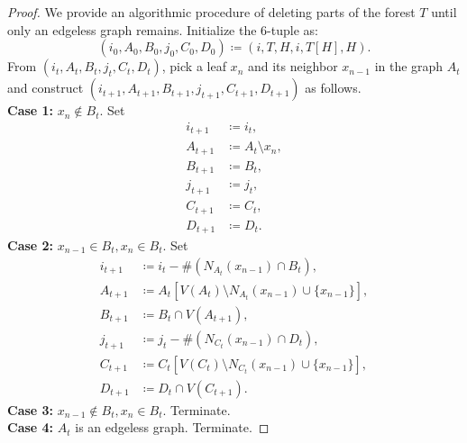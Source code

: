 \documentclass[dvipsnames,10pt]{article}
\begin{document}
\begin{proof}
    We provide an algorithmic procedure of deleting parts of the forest $T$ until only an edgeless graph remains. Initialize the $6$-tuple as:
    \begin{equation*}
        (i_0,A_0,B_0,j_0,C_0,D_0)\coloneq (i,T,H,i,T[H],H).
    \end{equation*}
    From $(i_t,A_t,B_t,j_t,C_t,D_t)$, pick a leaf $x_n$ and its neighbor $x_{n-1}$ in the graph $A_t$ and construct $(i_{t+1},A_{t+1},B_{t+1},j_{t+1},C_{t+1},D_{t+1})$ as follows.\\
    \textbf{Case 1:} $x_n\notin B_t$. Set
    \begin{align*}
        i_{t+1}&\coloneq i_t,\\
        A_{t+1}&\coloneq A_t\setminus x_n,\\
        B_{t+1}&\coloneq B_t,\\
        j_{t+1}&\coloneq j_t,\\
        C_{t+1}&\coloneq C_t,\\
        D_{t+1}&\coloneq D_t.
    \end{align*}
    \textbf{Case 2:} $x_{n-1}\in B_t,x_n\in B_t$. Set
    \begin{align*}
        i_{t+1}&\coloneq i_t-\#(N_{A_t}(x_{n-1})\cap B_t),\\
        A_{t+1}&\coloneq A_t[V(A_t)\setminus N_{A_t}(x_{n-1})\cup\{x_{n-1}\}],\\
        B_{t+1}&\coloneq B_t\cap V(A_{t+1}),\\
        j_{t+1}&\coloneq j_t-\#(N_{C_t}(x_{n-1})\cap D_t),\\
        C_{t+1}&\coloneq C_t[V(C_t)\setminus N_{C_t}(x_{n-1})\cup\{x_{n-1}\}],\\
        D_{t+1}&\coloneq D_t\cap V(C_{t+1}).
    \end{align*}
    \textbf{Case 3:} $x_{n-1}\notin B_t,x_n\in B_t$. Terminate.\\
    \textbf{Case 4:} $A_t$ is an edgeless graph. Terminate.


\end{proof}
\end{document}
